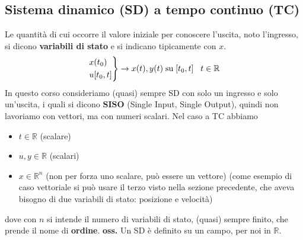 \subsection{Sistema dinamico (SD) a tempo continuo (TC)}
Le quantità di cui occorre il valore iniziale per conoscere l'uscita, noto l'ingresso, si dicono \textbf{variabili di stato} e si indicano tipicamente con $x$.
\[
    \begin{rcases}
        x(t_0)\\
        u[t_0,t]
    \end{rcases} \rightarrow x(t), y(t) \;\text{su}\; [t_0,t] \;\;\;t \in \mathbb{R}
\]
In questo corso consideriamo (quasi) sempre SD con solo un ingresso e solo un'uscita, i quali si dicono \textbf{SISO} (Single Input, Single Output), quindi non lavoriamo con vettori, ma con numeri scalari.\newline
Nel caso a TC abbiamo
\begin{itemize}
    \item $t \in \mathbb{R}$ (scalare)
    \item $u,y \in \mathbb{R}$ (scalari)
    \item $x \in \mathbb{R}^n$ (non per forza uno scalare, può essere un vettore) (come esempio di caso vettoriale si può usare il terzo visto nella sezione precedente, che aveva bisogno di due variabili di stato: posizione e velocità)
\end{itemize} 
dove con $n$ si intende il numero di variabili di stato, (quasi) sempre finito, che prende il nome di \textbf{ordine}.\newline
\textbf{oss.} Un SD è definito su un campo, per noi in $\mathbb{R}$.
